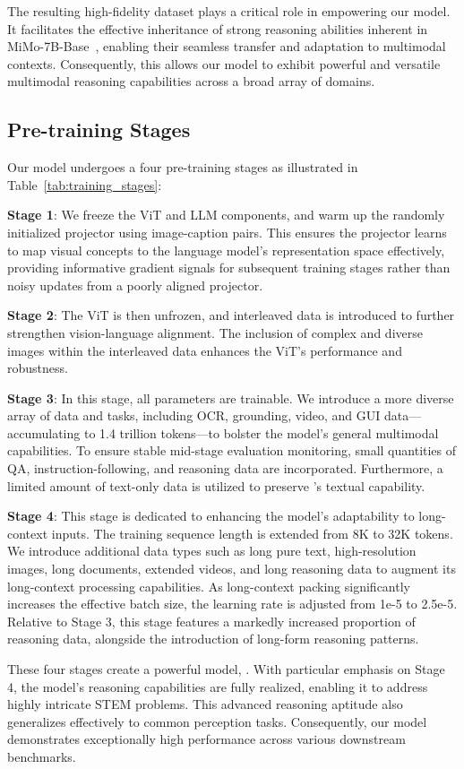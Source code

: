 The resulting high-fidelity dataset plays a critical role in empowering our model. It facilitates the effective inheritance of strong reasoning abilities inherent in MiMo-7B-Base~\citep{xia2025mimo}, enabling their seamless transfer and adaptation to multimodal contexts. Consequently, this allows our model to exhibit powerful and versatile multimodal reasoning capabilities across a broad array of domains.

\subsection{Pre-training Stages}

Our model undergoes a four pre-training stages as illustrated in Table~\ref{tab:training_stages}:


\textbf{Stage 1}: We freeze the ViT and LLM components, and warm up the randomly initialized projector using image-caption pairs.
This ensures the projector learns to map visual concepts to the language model's representation space effectively, providing informative gradient signals for subsequent training stages rather than noisy updates from a poorly aligned projector.


\textbf{Stage 2}: The ViT is then unfrozen, and interleaved data is introduced to further strengthen vision-language alignment. The inclusion of complex and diverse images within the interleaved data enhances the ViT's performance and robustness.

\textbf{Stage 3}: In this stage, all parameters are trainable. We introduce a more diverse array of data and tasks, including OCR, grounding, video, and GUI data—accumulating to 1.4 trillion tokens—to bolster the model's general multimodal capabilities. To ensure stable mid-stage evaluation monitoring, small quantities of QA, instruction-following, and reasoning data are incorporated. Furthermore, a limited amount of text-only data is utilized to preserve \mimobase{}'s textual capability.

\textbf{Stage 4}: This stage is dedicated to enhancing the model's adaptability to long-context inputs. 
The training sequence length is extended from 8K to 32K tokens. 
We introduce additional data types such as long pure text, high-resolution images, long documents, extended videos, and long reasoning data to augment its long-context processing capabilities. 
As long-context packing significantly increases the effective batch size, the learning rate is adjusted from 1e-5 to 2.5e-5. 
Relative to Stage 3, this stage features a markedly increased proportion of reasoning data, alongside the introduction of long-form reasoning patterns.


These four stages create a powerful model, \mimovlsft{}. With particular emphasis on Stage 4, the model's reasoning capabilities are fully realized, enabling it to address highly intricate STEM problems. This advanced reasoning aptitude also generalizes effectively to common perception tasks. Consequently, our model demonstrates exceptionally high performance across various downstream benchmarks.
